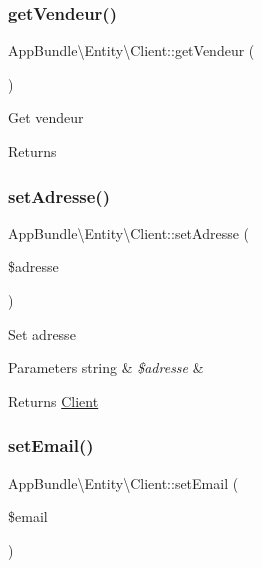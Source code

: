\subsubsection{\texorpdfstring{get\+Vendeur()}{getVendeur()}}
{\footnotesize\ttfamily App\+Bundle\textbackslash{}\+Entity\textbackslash{}\+Client\+::get\+Vendeur (\begin{DoxyParamCaption}{ }\end{DoxyParamCaption})}

Get vendeur

\begin{DoxyReturn}{Returns}

\end{DoxyReturn}
\mbox{\label{class_app_bundle_1_1_entity_1_1_client_a06e8d1cbc1734161ab944cfefaa3ae85}} 
\subsubsection{\texorpdfstring{set\+Adresse()}{setAdresse()}}
{\footnotesize\ttfamily App\+Bundle\textbackslash{}\+Entity\textbackslash{}\+Client\+::set\+Adresse (\begin{DoxyParamCaption}\item[{}]{\$adresse }\end{DoxyParamCaption})}

Set adresse


\begin{DoxyParams}[1]{Parameters}
string & {\em \$adresse} & \\
\hline
\end{DoxyParams}
\begin{DoxyReturn}{Returns}
\hyperlink{class_app_bundle_1_1_entity_1_1_client}{Client} 
\end{DoxyReturn}
\mbox{\label{class_app_bundle_1_1_entity_1_1_client_a4a91f39255a5fc19f73760f4c675e886}} 
\subsubsection{\texorpdfstring{set\+Email()}{setEmail()}}
{\footnotesize\ttfamily App\+Bundle\textbackslash{}\+Entity\textbackslash{}\+Client\+::set\+Email (\begin{DoxyParamCaption}\item[{}]{\$email }\end{DoxyParamCaption})}


